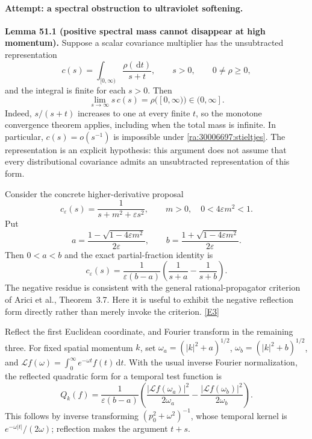 \documentclass[11pt]{article}
\newcommand{\dd}{\,\mathrm d}
\newcommand{\eref}[2]{\hyperlink{extra:#1:#2}{[E#2]}}
\begin{document}
\paragraph{Attempt: a spectral obstruction to ultraviolet softening.}
\textbf{Lemma 51.1 (positive spectral mass cannot disappear at high
momentum).} Suppose a scalar covariance multiplier has the unsubtracted
representation
\begin{equation}\label{ra:30006697:stieltjes}
 c(s)=\int_{[0,\infty)}\frac{\rho(\dd t)}{s+t},\qquad s>0,
 \qquad 0\ne\rho\ge0,
\end{equation}
and the integral is finite for each $s>0$. Then
\[
 \lim_{s\to\infty}s\,c(s)=\rho([0,\infty))\in(0,\infty].
\]
Indeed, $s/(s+t)$ increases to one at every finite $t$, so the monotone
convergence theorem applies, including when the total mass is infinite.
In particular, $c(s)=o(s^{-1})$ is impossible under
\eqref{ra:30006697:stieltjes}. The representation is an explicit hypothesis:
this argument does not assume that every distributional covariance admits
an unsubtracted representation of this form.

Consider the concrete higher-derivative proposal
\[
 c_\varepsilon(s)=\frac{1}{s+m^2+\varepsilon s^2},\qquad
 m>0,\quad 0<4\varepsilon m^2<1.
\]
Put
\[
 a=\frac{1-\sqrt{1-4\varepsilon m^2}}{2\varepsilon},\qquad
 b=\frac{1+\sqrt{1-4\varepsilon m^2}}{2\varepsilon}.
\]
Then $0<a<b$ and the exact partial-fraction identity is
\begin{equation}\label{ra:30006697:ghost}
 c_\varepsilon(s)=\frac{1}{\varepsilon(b-a)}
 \left(\frac{1}{s+a}-\frac{1}{s+b}\right).
\end{equation}
The negative residue is consistent with the general rational-propagator
criterion of Arici et al., Theorem~3.7. Here it is useful to exhibit the
negative reflection form directly rather than merely invoke the criterion.
\eref{30006697}{3}

Reflect the first Euclidean coordinate, and Fourier transform in the
remaining three. For fixed spatial momentum $k$, set
$\omega_a=(|k|^2+a)^{1/2}$, $\omega_b=(|k|^2+b)^{1/2}$, and
$\mathcal Lf(\omega)=\int_0^\infty e^{-\omega t}f(t)\dd t$.
With the usual inverse Fourier normalization, the reflected quadratic form
for a temporal test function is
\begin{equation}\label{ra:30006697:reflection}
 Q_k(f)=\frac{1}{\varepsilon(b-a)}
 \left(\frac{|\mathcal Lf(\omega_a)|^2}{2\omega_a}
       -\frac{|\mathcal Lf(\omega_b)|^2}{2\omega_b}\right).
\end{equation}
This follows by inverse transforming $(p_0^2+\omega^2)^{-1}$, whose temporal
kernel is $e^{-\omega|t|}/(2\omega)$; reflection makes the argument $t+s$.
\end{document}
